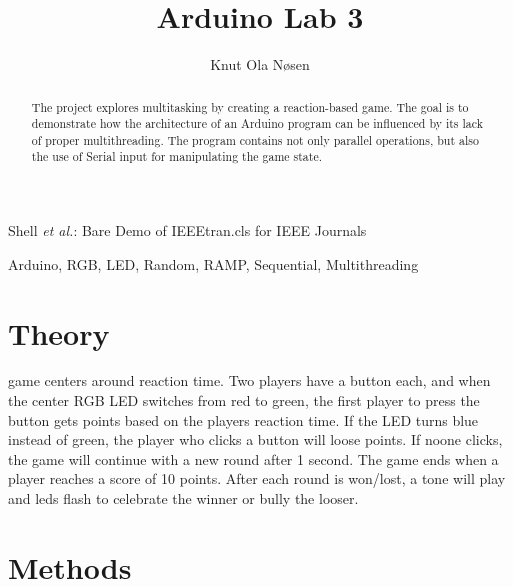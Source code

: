 \documentclass[journal]{IEEEtran}
\begin{document}
\title{Arduino Lab 3}

\author{Knut Ola Nøsen
}%

{Shell \MakeLowercase{\textit{et al.}}: Bare Demo of IEEEtran.cls for IEEE Journals}

\maketitle

\begin{abstract}
    The project explores multitasking by creating a reaction-based game. The goal is to demonstrate how
    the architecture of an Arduino program can be influenced by its lack of proper multithreading.
    The program contains not only parallel operations, but also the use of Serial input for manipulating
    the game state.
\end{abstract}

\begin{IEEEkeywords}
    Arduino, RGB, LED, Random, RAMP, Sequential, Multithreading
\end{IEEEkeywords}

\section{Theory}

game centers around reaction time. Two players have a button each, and when the center RGB LED switches
from red to green, the first player to press the button gets points based on the players reaction time.
If the LED turns blue instead of green, the player who clicks a button will loose points. If noone clicks,
the game will continue with a new round after 1 second. The game ends when a player reaches a score of 10 points.
After each round is won/lost, a tone will play and leds flash to celebrate the winner or bully the looser.

\section{Methods}
\end{document}
